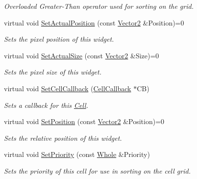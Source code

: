 \begin{DoxyCompactItemize}
\begin{DoxyCompactList}\small\item\em Overloaded Greater-\/Than operator used for sorting on the grid. \item\end{DoxyCompactList}\item 
virtual void \hyperlink{classMezzanine_1_1UI_1_1Cell_ada818056ebb50413109b1c8d8a7fa3e0}{SetActualPosition} (const \hyperlink{classMezzanine_1_1Vector2}{Vector2} \&Position)=0
\begin{DoxyCompactList}\small\item\em Sets the pixel position of this widget. \item\end{DoxyCompactList}\item 
virtual void \hyperlink{classMezzanine_1_1UI_1_1Cell_a4861322821bdd28429994ab49bea6083}{SetActualSize} (const \hyperlink{classMezzanine_1_1Vector2}{Vector2} \&Size)=0
\begin{DoxyCompactList}\small\item\em Sets the pixel size of this widget. \item\end{DoxyCompactList}\item 
virtual void \hyperlink{classMezzanine_1_1UI_1_1Cell_a8d4d280682b38703d114e073c002e757}{SetCellCallback} (\hyperlink{classMezzanine_1_1UI_1_1CellCallback}{CellCallback} $\ast$CB)
\begin{DoxyCompactList}\small\item\em Sets a callback for this \hyperlink{classMezzanine_1_1UI_1_1Cell}{Cell}. \item\end{DoxyCompactList}\item 
virtual void \hyperlink{classMezzanine_1_1UI_1_1Cell_a50efe6a1d981f4de5bfa4124ab9dd256}{SetPosition} (const \hyperlink{classMezzanine_1_1Vector2}{Vector2} \&Position)=0
\begin{DoxyCompactList}\small\item\em Sets the relative position of this widget. \item\end{DoxyCompactList}\item 
virtual void \hyperlink{classMezzanine_1_1UI_1_1Cell_af728d8b2287b70c2d0956249e0afcd53}{SetPriority} (const \hyperlink{namespaceMezzanine_adcbb6ce6d1eb4379d109e51171e2e493}{Whole} \&Priority)
\begin{DoxyCompactList}\small\item\em Sets the priority of this cell for use in sorting on the cell grid. \item\end{DoxyCompactList}\item 

\end{DoxyCompactItemize}
